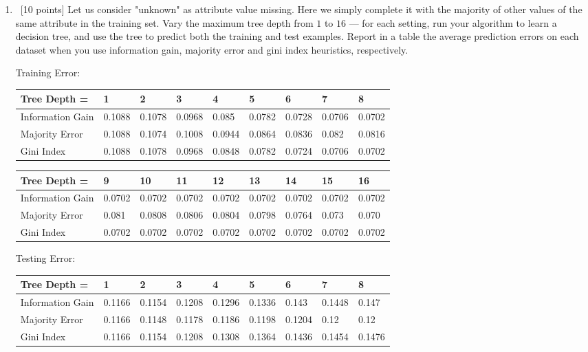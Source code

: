 \documentclass[12pt, fullpage,letterpaper]{article}
\begin{document}
\begin{enumerate}
\begin{enumerate}
\pagebreak
	
	\item~[10 points] Let us consider "unknown" as attribute value missing. Here we simply complete it with the majority of other values of the same attribute in the training set.   Vary the maximum  tree depth from $1$ to $16$ --- for each setting, run your algorithm to learn a decision tree, and use the tree to  predict both the training  and test examples. Report in a table the average prediction errors on each dataset when you use information gain, majority error and gini index heuristics, respectively.
	
	  \newline
	Training Error:
	\begin{table}[h]
		\begin{tabular}{l||llllllll}
			Tree Depth = & 1 & 2 & 3 & 4 & 5 & 6 & 7 & 8 \\
			\hline\hline
			Information Gain & 0.1088 & 0.1078 & 0.0968 & 0.085 & 0.0782 & 0.0728 & 0.0706 & 0.0702 \\
			Majority Error & 0.1088 & 0.1074 & 0.1008 & 0.0944 & 0.0864 & 0.0836 & 0.082 & 0.0816 \\
			Gini Index & 0.1088 & 0.1078 & 0.0968 & 0.0848 & 0.0782 & 0.0724 & 0.0706 & 0.0702 \\
		\end{tabular}
	\end{table}
	
	\begin{table}[h]
		\begin{tabular}{l||llllllll}
			Tree Depth = & 9 & 10 & 11 & 12 & 13 & 14 & 15 & 16 \\
			\hline\hline
			Information Gain & 0.0702 & 0.0702 & 0.0702 & 0.0702 & 0.0702 & 0.0702 & 0.0702 & 0.0702 \\
			Majority Error & 0.081 & 0.0808 & 0.0806 & 0.0804 & 0.0798 & 0.0764 & 0.073 & 0.070 \\
			Gini Index & 0.0702 & 0.0702 & 0.0702 & 0.0702 & 0.0702 & 0.0702 & 0.0702 & 0.0702 \\
		\end{tabular}
	\end{table}
	
	Testing Error:
	\begin{table}[h]
		\begin{tabular}{l||llllllll}
			Tree Depth = & 1 & 2 & 3 & 4 & 5 & 6 & 7 & 8 \\
			\hline\hline
			Information Gain & 0.1166 & 0.1154 & 0.1208 & 0.1296 & 0.1336 & 0.143 & 0.1448 & 0.147 \\
			Majority Error & 0.1166 & 0.1148 & 0.1178 & 0.1186 & 0.1198 & 0.1204 & 0.12 & 0.12 \\
			Gini Index & 0.1166 & 0.1154 & 0.1208 & 0.1308 & 0.1364 & 0.1436 & 0.1454 & 0.1476 \\
		\end{tabular}
	\end{table}
	

\end{enumerate}
\end{enumerate}
\end{document}
